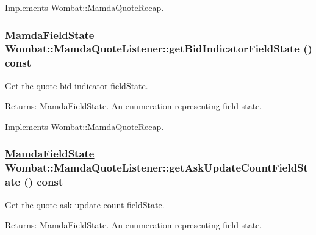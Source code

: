 Implements \hyperlink{classWombat_1_1MamdaQuoteRecap_b788be211493a7091449796df22c6173}{Wombat::Mamda\-Quote\-Recap}.\hypertarget{classWombat_1_1MamdaQuoteListener_276b02c48efaa043e0d394569fe68a02}{
\subsubsection[getBidIndicatorFieldState]{\setlength{\rightskip}{0pt plus 5cm}\hyperlink{namespaceWombat_93aac974f2ab713554fd12a1fa3b7d2a}{Mamda\-Field\-State} Wombat::Mamda\-Quote\-Listener::get\-Bid\-Indicator\-Field\-State () const}}
\label{classWombat_1_1MamdaQuoteListener_276b02c48efaa043e0d394569fe68a02}


Get the quote bid indicator field\-State. 

\begin{Desc}
\item[Returns:]Mamda\-Field\-State. An enumeration representing field state. \end{Desc}


Implements \hyperlink{classWombat_1_1MamdaQuoteRecap_ff522048df5c7fe409315f4d694ddaca}{Wombat::Mamda\-Quote\-Recap}.\hypertarget{classWombat_1_1MamdaQuoteListener_a9d06f74666624d69ff4e6303a626532}{
\subsubsection[getAskUpdateCountFieldState]{\setlength{\rightskip}{0pt plus 5cm}\hyperlink{namespaceWombat_93aac974f2ab713554fd12a1fa3b7d2a}{Mamda\-Field\-State} Wombat::Mamda\-Quote\-Listener::get\-Ask\-Update\-Count\-Field\-State () const}}
\label{classWombat_1_1MamdaQuoteListener_a9d06f74666624d69ff4e6303a626532}


Get the quote ask update count field\-State. 

\begin{Desc}
\item[Returns:]Mamda\-Field\-State. An enumeration representing field state. \end{Desc}


